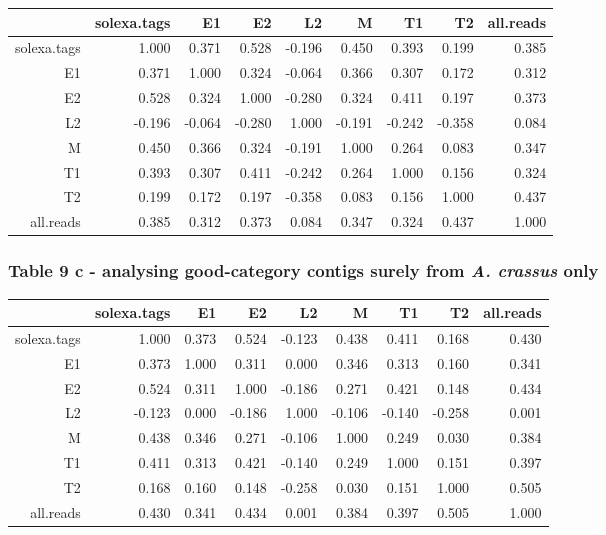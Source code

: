 \documentclass[10pt]{bmc_article}
\newenvironment{bmcformat}{\begin{raggedright}\baselineskip20pt\sloppy\setboolean{publ}{false}}{\end{raggedright}\baselineskip20pt\sloppy}
\begin{document}
\begin{bmcformat}
\begin{tabular}{rrrrrrrrr}
  \hline
 & solexa.tags & E1 & E2 & L2 & M & T1 & T2 & all.reads \\ 
  \hline
solexa.tags & 1.000 & 0.371 & 0.528 & -0.196 & 0.450 & 0.393 & 0.199 & 0.385 \\ 
  E1 & 0.371 & 1.000 & 0.324 & -0.064 & 0.366 & 0.307 & 0.172 & 0.312 \\ 
  E2 & 0.528 & 0.324 & 1.000 & -0.280 & 0.324 & 0.411 & 0.197 & 0.373 \\ 
  L2 & -0.196 & -0.064 & -0.280 & 1.000 & -0.191 & -0.242 & -0.358 & 0.084 \\ 
  M & 0.450 & 0.366 & 0.324 & -0.191 & 1.000 & 0.264 & 0.083 & 0.347 \\ 
  T1 & 0.393 & 0.307 & 0.411 & -0.242 & 0.264 & 1.000 & 0.156 & 0.324 \\ 
  T2 & 0.199 & 0.172 & 0.197 & -0.358 & 0.083 & 0.156 & 1.000 & 0.437 \\ 
  all.reads & 0.385 & 0.312 & 0.373 & 0.084 & 0.347 & 0.324 & 0.437 & 1.000 \\ 
   \hline
\end{tabular}
\subsubsection*{Table 9 c - analysing good-category contigs surely from \textit{A. crassus} only}

\begin{tabular}{rrrrrrrrr}
  \hline
 & solexa.tags & E1 & E2 & L2 & M & T1 & T2 & all.reads \\ 
  \hline
solexa.tags & 1.000 & 0.373 & 0.524 & -0.123 & 0.438 & 0.411 & 0.168 & 0.430 \\ 
  E1 & 0.373 & 1.000 & 0.311 & 0.000 & 0.346 & 0.313 & 0.160 & 0.341 \\ 
  E2 & 0.524 & 0.311 & 1.000 & -0.186 & 0.271 & 0.421 & 0.148 & 0.434 \\ 
  L2 & -0.123 & 0.000 & -0.186 & 1.000 & -0.106 & -0.140 & -0.258 & 0.001 \\ 
  M & 0.438 & 0.346 & 0.271 & -0.106 & 1.000 & 0.249 & 0.030 & 0.384 \\ 
  T1 & 0.411 & 0.313 & 0.421 & -0.140 & 0.249 & 1.000 & 0.151 & 0.397 \\ 
  T2 & 0.168 & 0.160 & 0.148 & -0.258 & 0.030 & 0.151 & 1.000 & 0.505 \\ 
  all.reads & 0.430 & 0.341 & 0.434 & 0.001 & 0.384 & 0.397 & 0.505 & 1.000 \\ 
   \hline
\end{tabular}


\end{bmcformat}
\end{document}
